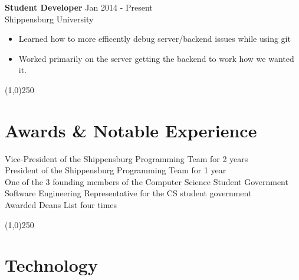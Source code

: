 \documentclass[margin,line, 11pt]{resume}
\begin{document}
\begin{resume}
    \textbf{Student Developer} 	\hfill Jan 2014 - Present \vspace{1.5mm}\\
    Shippensburg University 
    \begin{itemize}
      \item Learned how to more efficently debug server/backend issues while using git
      \item Worked primarily on the server getting the backend to work how we wanted it.
    \end{itemize}
    
    \vspace{-5mm}
    \line(1,0){250}

    
    \section{\mysidestyle \textbf {Awards \& Notable Experience} }
    
    \vspace{0mm}
    

    Vice-President of the Shippensburg Programming Team for 2 years					\vspace{2mm}\\
    President of the Shippensburg Programming Team for 1 year				\vspace{2mm}\\
    One of the 3 founding members of the Computer Science Student Government		\vspace{2mm}\\		
    Software Engineering Representative for the CS student government		\vspace{2mm}\\
    Awarded Deans List four times						
    
    \vspace{-5mm}
    \line(1,0){250}
    
   
    \section{\mysidestyle \textbf {Technology} }
    

\end{resume}
\end{document}
